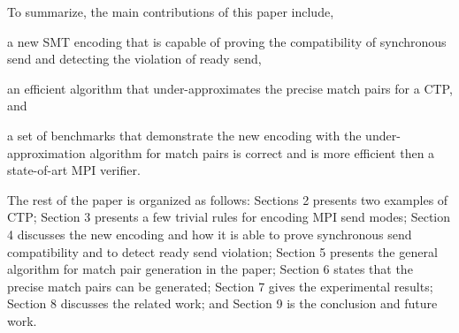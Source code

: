 To summarize, the main contributions of this paper include,
\begin{compactitem}
\item a new SMT encoding that is capable of proving the compatibility of synchronous send and detecting the violation of ready send,
\item an efficient algorithm that under-approximates the precise match pairs for a CTP, and
\item a set of benchmarks that demonstrate the new encoding with the under-approximation algorithm for match pairs is correct and is more efficient then a state-of-art MPI verifier. 
\end{compactitem}

The rest of the paper is organized as follows: 
Sections 2 presents two examples of CTP; Section 3 presents a few trivial rules for encoding MPI send modes; Section 4 discusses the new encoding and how it is able to prove synchronous send compatibility and to detect ready send violation;
Section 5 presents the general algorithm for match pair generation in the paper; Section 6 states that the precise match pairs can be generated; Section 7 gives the experimental results; Section 8 discusses the related work; and Section 9 is the conclusion and future work.



